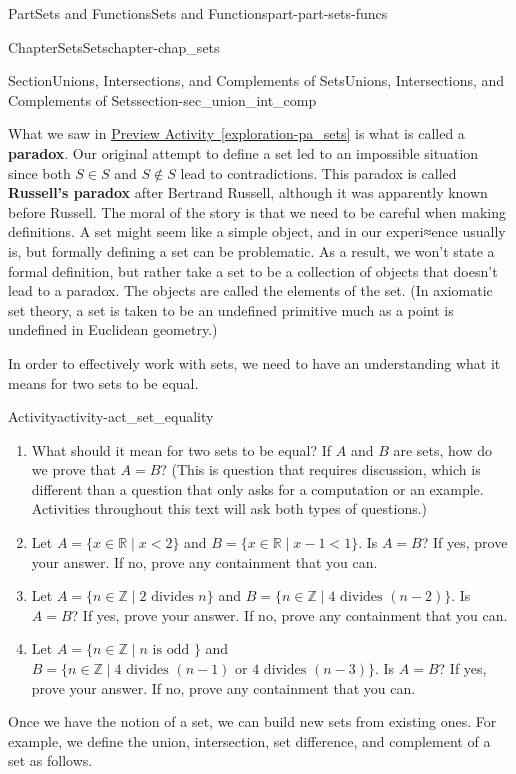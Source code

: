\documentclass[oneside,10pt,]{book}
\newcommand{\xreffont}{\relax}
\newcommand{\terminology}[1]{\textbf{#1}}
\numberwithin{equation}{chapter}
\newcommand{\Z}{\mathbb{Z}}
\newcommand{\R}{\mathbb{R}}
\newcommand{\lt}{<}
\begin{document}
\begin{partptx}{Part}{Sets and Functions}{}{Sets and Functions}{}{}{part-part-sets-funcs}
\begin{chapterptx}{Chapter}{Sets}{}{Sets}{}{}{chapter-chap_sets}
\begin{sectionptx}{Section}{Unions, Intersections, and Complements of Sets}{}{Unions, Intersections, and Complements of Sets}{}{}{section-sec_union_int_comp}
\par
{} What we saw in \hyperref[exploration-pa_sets]{Preview Activity~{\xreffont\ref{exploration-pa_sets}}} is what is called a \terminology{paradox}. Our original attempt to define a set led to an impossible situation since both \(S \in S\) and \(S \notin S\) lead to contradictions. This paradox is called \terminology{Russell's paradox} after Bertrand Russell, although it was apparently known before Russell. The moral of the story is that we need to be careful when making definitions. A set might seem like a simple object, and in our experi≈ence usually is, but formally defining a set can be problematic. As a result, we won't state a formal definition, but rather take a set to be a collection of objects that doesn't lead to a paradox. The objects are called the elements of the set. (In axiomatic set theory, a set is taken to be an undefined primitive \textemdash{} much as a point is undefined in Euclidean geometry.)%
\par
In order to effectively work with sets, we need to have an understanding what it means for two sets to be equal.%
\begin{activity}{Activity}{}{activity-act_set_equality}%
\begin{enumerate}[font=\bfseries,label=(\alph*),ref=\alph*]%
\item{}What should it mean for two sets to be equal? If \(A\) and \(B\) are sets, how do we prove that \(A = B\)? (This is question that requires discussion, which is different than a question that only asks for a computation or an example. Activities throughout this text will ask both types of questions.)%
\item{}Let \(A = \{x \in \R \mid x \lt 2\}\) and \(B = \{x \in \R \mid x-1 \lt 1\}\). Is \(A=B\)? If yes, prove your answer. If no, prove any containment that you can.%
\item{}Let \(A = \{n \in \Z \mid 2 \text{ divides } n\}\) and \(B = \{n \in \Z \mid 4 \text{ divides } (n-2)\}\). Is \(A=B\)? If yes, prove your answer. If no, prove any containment that you can.%
\item{}Let \(A = \{n \in \Z \mid n \text{ is odd } \}\) and \(B = \{n \in \Z \mid 4 \text{ divides } (n-1) \text{ or } 4 \text{ divides } (n-3)\}\). Is \(A=B\)? If yes, prove your answer. If no, prove any containment that you can.%
\end{enumerate}%
\end{activity}%
Once we have the notion of a set, we can build new sets from existing ones. For example, we define the union, intersection, set difference, and complement of a set as follows.%

\end{sectionptx}
\end{chapterptx}
\end{partptx}
\end{document}
